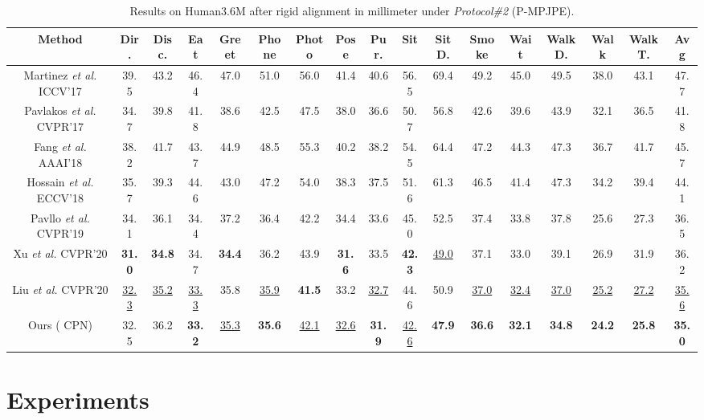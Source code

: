 \documentclass[sigconf]{acmart}
\begin{document}
\begin{table*}[ht]\small
  \centering
  \renewcommand\tabcolsep{4.0pt}
  \caption{Results on Human3.6M after rigid alignment in millimeter under \textit{Protocol\#2} (P-MPJPE).  }
\begin{tabular}{c|ccccccccccccccc|c}
    \toprule
    Method & Dir. & Disc. & Eat & Greet & Phone & Photo & Pose & Pur. & Sit & SitD. & Smoke & Wait & WalkD. & Walk & WalkT. & Avg \\
    \midrule
    Martinez \textit{et al.} \cite{martinez2017simple} ICCV'17& 39.5&43.2&46.4&47.0&51.0&56.0&41.4&40.6&56.5&69.4&49.2&45.0&49.5&38.0&43.1&47.7 \\
    Pavlakos \textit{et al.} \cite{pavlakos2017coarse} CVPR'17& 34.7&39.8&41.8&38.6&42.5&47.5&38.0&36.6&50.7&56.8&42.6&39.6&43.9&32.1&36.5&41.8 \\
    Fang \textit{et al.} \cite{fang2018learning} AAAI'18& 38.2&41.7&43.7&44.9&48.5&55.3&40.2&38.2&54.5&64.4&47.2&44.3&47.3&36.7&41.7&45.7 \\
    Hossain \textit{et al.} \cite{hossain2018exploiting} ECCV'18& 35.7&39.3&44.6&43.0&47.2&54.0&38.3&37.5&51.6&61.3&46.5&41.4&47.3&34.2&39.4&44.1 \\
    Pavllo \textit{et al.} \cite{jllo20193d} CVPR'19& 34.1&36.1&34.4&37.2&36.4&42.2&34.4&33.6&45.0&52.5&37.4&33.8&37.8&25.6&27.3&36.5 \\
    Xu \textit{et al.} \cite{xu2020deep} CVPR'20
    &\textbf{31.0}&\textbf{34.8}&34.7&\textbf{34.4}&36.2&43.9&\textbf{31.6}&33.5&\textbf{42.3}&\underline{49.0}&37.1&33.0&39.1&26.9&31.9&36.2\\
    Liu \textit{et al.} \cite{liu2020attention} CVPR'20& \underline{32.3}&\underline{35.2}&\underline{33.3}&35.8&\underline{35.9}&\textbf{41.5}&33.2&\underline{32.7}&44.6&50.9&\underline{37.0}&\underline{32.4}&\underline{37.0}&\underline{25.2}&\underline{27.2}&\underline{35.6} \\


    \midrule
    Ours ( CPN) & 32.5&36.2&\textbf{33.2}&\underline{35.3}&\textbf{35.6}&\underline{42.1}&\underline{32.6}&\textbf{31.9}&\underline{42.6}&\textbf{47.9}&\textbf{36.6}&\textbf{32.1}&\textbf{34.8}&\textbf{24.2}&\textbf{25.8}&\textbf{35.0} \\
    \bottomrule
    \end{tabular}
    \vspace{-0.3cm}
  \label{tab2}
\end{table*}

\section{Experiments}
\end{document}
